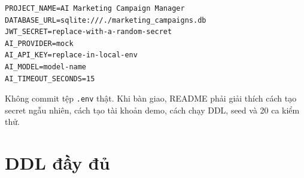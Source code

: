 \begin{lstlisting}[language={},caption={Tệp .env.example không chứa secret thật}]
PROJECT_NAME=AI Marketing Campaign Manager
DATABASE_URL=sqlite:///./marketing_campaigns.db
JWT_SECRET=replace-with-a-random-secret
AI_PROVIDER=mock
AI_API_KEY=replace-in-local-env
AI_MODEL=model-name
AI_TIMEOUT_SECONDS=15
\end{lstlisting}

\noindent Không commit tệp \texttt{.env} thật. Khi bàn giao, README phải giải thích cách tạo secret ngẫu nhiên, cách tạo tài khoản demo, cách chạy DDL, seed và 20 ca kiểm thử.

\section{DDL đầy đủ}


